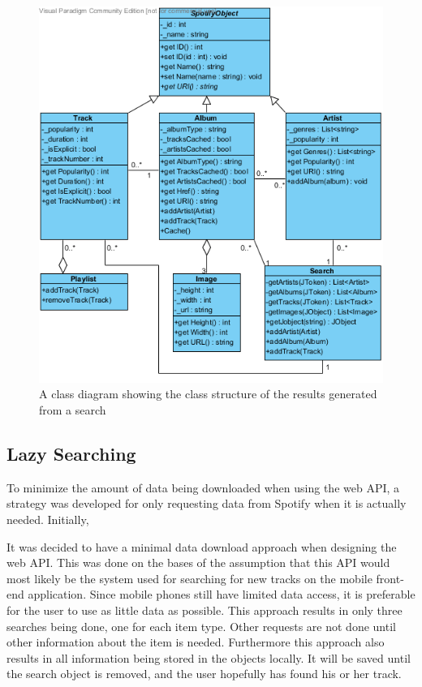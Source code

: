 \begin{figure}[hbtp]
\centering
\includegraphics[width=\textwidth]{Images/WebAPIUML.png}
\caption{A class diagram showing the class structure of the results generated from a search}
\label{fig:WebAPIUML}
\end{figure}

\subsection{Lazy Searching}

To minimize the amount of data being downloaded when using the web API, a strategy was developed for only requesting data from Spotify when it is actually needed. Initially, 

It was decided to have a minimal data download approach when designing the web API. This was done on the bases of the assumption that this API would most likely be the system used for searching for new tracks on the mobile front-end application. Since mobile phones still have limited data access, it is preferable for the user to use as little data as possible. This approach results in only three searches being done, one for each item type. Other requests are not done until other information about the item is needed. Furthermore this approach also results in all information being stored in the objects locally. It will be saved until the search object is removed, and the user hopefully has found his or her track.

